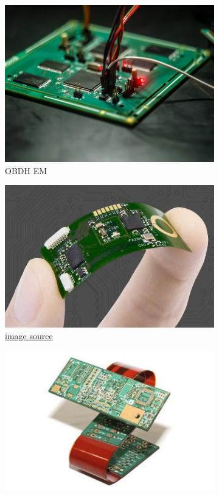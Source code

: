 \documentclass[final]{cubedoc}
\begin{document}
	
	\begin{figure}[h!]
		\centering
		\begin{subfigure}{.3\textwidth}
			\centering
			\includegraphics[height=0.2\textheight, width=.8\textwidth]{assets/rigid_obc.jpg}
			\caption{OBDH EM}
			\label{fig:sub1}
		\end{subfigure}%
		\begin{subfigure}{.3\textwidth}
			\centering
			\includegraphics[height=0.2\textheight, width=.8\textwidth]{assets/flex.jpg}
			\caption{\href{https://web.archive.org/web/20200813150519/https://sfxpcb.com/flex-pcb-vs-ceramic-pcb/}{image source}}
			\label{fig:sub2}
		\end{subfigure}
		\begin{subfigure}{.3\textwidth}
			\centering
			\includegraphics[height=0.2\textheight, width=.8\textwidth]{assets/rigid_flex.jpg}

\end{subfigure}
\end{figure}
\end{document}
